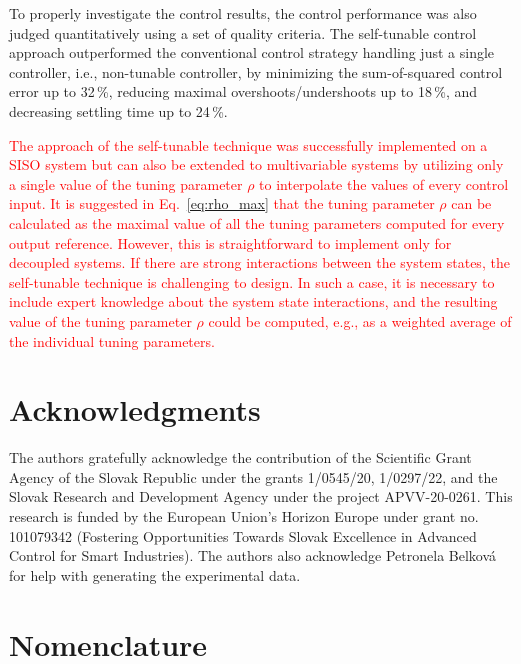 \documentclass[preprint,12pt]{elsarticle}
\newcommand{\change}[1]{\textcolor{red}{#1}}
\begin{document}
	To properly investigate the control results, the control performance was also judged quantitatively using a set of quality criteria. The self-tunable control approach outperformed the conventional control strategy handling just a single controller, i.e., non-tunable controller, by minimizing the sum-of-squared control error up to 32\,\%, reducing maximal overshoots/undershoots up to 18\,\%, and decreasing settling time up to 24\,\%. 
	
	\change{The approach of the self-tunable technique was successfully implemented on a SISO system but can also be extended to multivariable systems by utilizing only a single value of the tuning parameter $\rho$ to interpolate the values of every control input. It is suggested in Eq.~\eqref{eq:rho_max} that the tuning parameter $\rho$ can be calculated as the maximal value of all the tuning parameters computed for every output reference. However, this is straightforward to implement only for decoupled systems. If there are strong interactions between the system states, the self-tunable technique is challenging to design. In such a case, it is necessary to include expert knowledge about the system state interactions, and the resulting value of the tuning parameter $\rho$ could be computed, e.g., as a weighted average of the individual tuning parameters.}
	\section*{Acknowledgments}
	
	The authors gratefully acknowledge the contribution of the Scientific Grant Agency of the Slovak Republic under the grants 1/0545/20, 1/0297/22, and the Slovak Research and Development Agency under the project APVV-20-0261. 
	This research is funded by the European Union’s Horizon Europe under grant no. 101079342 (Fostering Opportunities Towards Slovak Excellence in Advanced Control for Smart Industries). The authors also acknowledge Petronela Belková for help with generating the experimental data.   
	
	\section*{Nomenclature}
	
\end{document}
